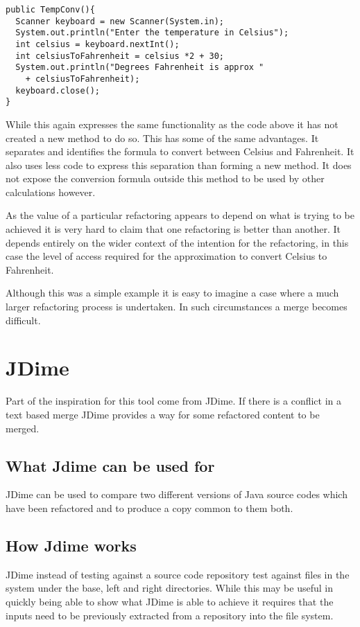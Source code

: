 \begin{lstlisting}
public TempConv(){
  Scanner keyboard = new Scanner(System.in);
  System.out.println("Enter the temperature in Celsius");
  int celsius = keyboard.nextInt();
  int celsiusToFahrenheit = celsius *2 + 30;
  System.out.println("Degrees Fahrenheit is approx " 
    + celsiusToFahrenheit);
  keyboard.close();
}
\end{lstlisting}

While this again expresses the same functionality as the code above it has not created a new method to do so. This has some of the same advantages. It separates and identifies the formula to convert between Celsius and Fahrenheit. It also uses less code to express this separation than forming a new method. It does not expose the conversion formula outside this method to be used by other calculations however.

As the value of a particular refactoring appears to depend on what is trying to be achieved it is very hard to claim that one refactoring is better than another. It depends entirely on the wider context of the intention for the refactoring, in this case the level of access required for the approximation to convert Celsius to Fahrenheit.

Although this was a simple example it is easy to imagine a case where a much larger refactoring process is undertaken. In such circumstances a merge becomes difficult. 

\section{JDime}
Part of the inspiration for this tool come from JDime. If there is a conflict in a text based merge JDime provides a way for some refactored content to be merged.  

\subsection{What Jdime can be used for}
JDime can be used to compare two different versions of Java source codes which have been refactored and to produce a copy common to them both. 

\subsection{How Jdime works}
JDime instead of testing against a source code repository test against files in the system under the base, left and right directories.
While this may be useful in quickly being able to show what JDime is able to achieve it requires that the inputs need to be previously extracted from a repository into the file system.

